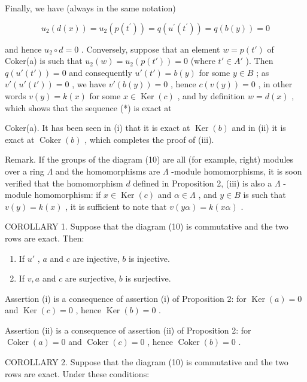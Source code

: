 Finally, we have (always in the same notation)

\[
u _ {2} (d (x)) = u _ {2} \left(p \left(t ^ {\prime}\right)\right) = q \left(u ^ {\prime} \left(t ^ {\prime}\right)\right) = q (b (y)) = 0
\]

and hence \(u_2 \circ d = 0\) . Conversely, suppose that an element \(w = p(t')\) of Coker(a) is such that \(u_2(w) = u_2(p(t')) = 0\) (where \(t' \in A'\) ). Then \(q(u'(t')) = 0\) and consequently \(u'(t') = b(y)\) for some \(y \in B\) ; as \(v'(u'(t')) = 0\) , we have \(v'(b(y)) = 0\) , hence \(c(v(y)) = 0\) , in other words \(v(y) = k(x)\) for some \(x \in \operatorname{Ker}(c)\) , and by definition \(w = d(x)\) , which shows that the sequence (*) is exact at

Coker(a). It has been seen in (i) that it is exact at \(\operatorname{Ker}(b)\) and in (ii) it is exact at \(\operatorname{Coker}(b)\) , which completes the proof of (iii).

Remark. If the groups of the diagram (10) are all (for example, right) modules over a ring \(\Lambda\) and the homomorphisms are \(\Lambda\) -module homomorphisms, it is soon verified that the homomorphism \(d\) defined in Proposition 2, (iii) is also a \(\Lambda\) -module homomorphism: if \(x \in \operatorname{Ker}(c)\) and \(\alpha \in \Lambda\) , and \(y \in B\) is such that \(v(y) = k(x)\) , it is sufficient to note that \(v(y\alpha) = k(x\alpha)\) .

COROLLARY 1. Suppose that the diagram (10) is commutative and the two rows are exact. Then:

\begin{enumerate}
\def\labelenumi{(\roman{enumi})}
\item
  If \(u'\) , \(a\) and \(c\) are injective, \(b\) is injective.
\item
  If \(v, a\) and \(c\) are surjective, \(b\) is surjective.
\end{enumerate}

Assertion (i) is a consequence of assertion (i) of Proposition 2: for \(\operatorname{Ker}(a) = 0\) and \(\operatorname{Ker}(c) = 0\) , hence \(\operatorname{Ker}(b) = 0\) .

Assertion (ii) is a consequence of assertion (ii) of Proposition 2: for \(\operatorname{Coker}(a) = 0\) and \(\operatorname{Coker}(c) = 0\) , hence \(\operatorname{Coker}(b) = 0\) .

COROLLARY 2. Suppose that the diagram (10) is commutative and the two rows are exact. Under these conditions:

